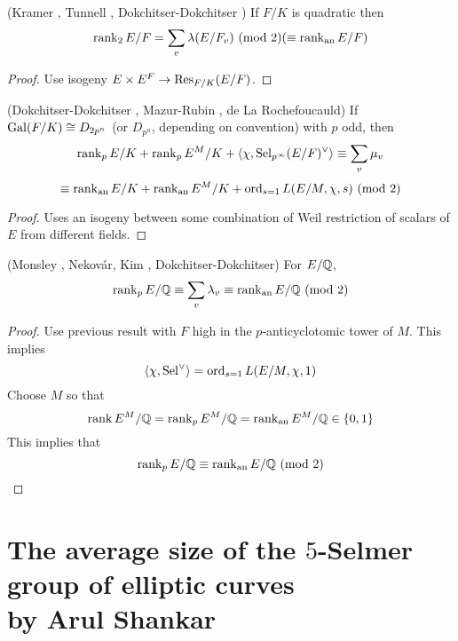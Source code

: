 \documentclass[12pt,amsfont]{amsart}
\begin{document}
\begin{thm} (Kramer , Tunnell , Dokchitser-Dokchitser ) If $F/K$ is quadratic then
\[\rank_2 E/F = \sum_v \lambda(E/F_v) \pmod{2} (\equiv \rank_{\text{an}} E/F)\]
\end{thm}

\begin{proof} Use isogeny $E \times E^F \rightarrow \operatorname{Res}_{F/K}(E/F)$. 
\end{proof}

\begin{thm} (Dokchitser-Dokchitser , Mazur-Rubin , de La Rochefoucauld) If $\operatorname{Gal}(F/K) \cong D_{2p^n}$ (or $D_{p^n}$, depending on convention) with $p$ odd, then
\[\operatorname{rank}_p E/K + \operatorname{rank}_p E^M/K + \langle \chi, \operatorname{Sel}_{p^\infty} (E/F)^\vee \rangle \equiv \sum_v \mu_v \] 
\[ \equiv \rank_{\text{an}} E/K + \rank_{\text{an}} E^M/K + \ord_{s=1} L(E/M, \chi, s) \pmod{2} \]
\end{thm}

\begin{proof} Uses an isogeny between some combination of Weil restriction of scalars of $E$ from different fields. 
\end{proof}

\begin{thm} (Monsley , Nekov\'{a}r, Kim , Dokchitser-Dokchitser) For $E/{\mathbb Q}$, 
\[\rank_p E/\bQ \equiv \sum_v \lambda_v \equiv \rank_{\text{an}} E/\bQ \pmod{2}\]
\end{thm}

\begin{proof} Use previous result with $F$ high in the $p$-anticyclotomic tower of $M$. This implies 
\[ \langle \chi, \operatorname{Sel}^\vee \rangle = \operatorname{ord}_{s=1} L(E/M, \chi, 1) \]
Choose $M$ so that
\[\operatorname{rank} E^M/{\mathbb Q} = \operatorname{rank}_p E^M /{\mathbb Q} = \operatorname{rank}_{\text{an}} E^M /{\mathbb Q} \in \{0,1\}\]
This implies that
\[\rank_p E/\bQ \equiv \rank_{\text{an}} E/\bQ \pmod{2} \]
\end{proof}

\renewcommand{\thesubsection}{\arabic{section}.R}
\begingroup
\renewcommand{\addcontentsline}[3]{}%
\endgroup
\newpage
\renewcommand{\thesubsection}{\arabic{section}.\arabic{subsection}}

\section{The average size of the $5$-Selmer group of elliptic curves\\ by Arul Shankar}\label{19}
\end{document}

